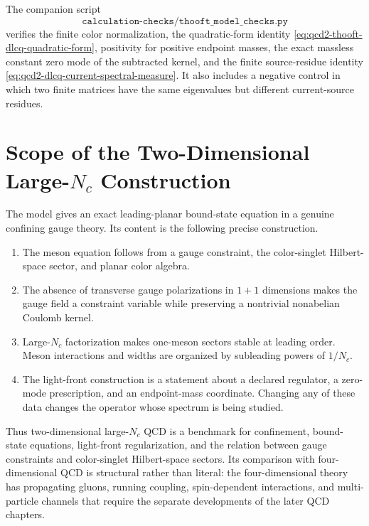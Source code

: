 The companion script
\[
  \texttt{calculation-checks/thooft\_model\_checks.py}
\]
verifies the finite color normalization, the quadratic-form identity
\eqref{eq:qcd2-thooft-dlcq-quadratic-form}, positivity for positive endpoint
masses, the exact massless constant zero mode of the subtracted kernel, and
the finite source-residue identity
\eqref{eq:qcd2-dlcq-current-spectral-measure}.  It also includes a negative
control in which two finite matrices have the same eigenvalues but different
current-source residues.

\section{\texorpdfstring{Scope of the Two-Dimensional Large-\(N_c\) Construction}{Scope of the Two-Dimensional Large-Nc Construction}}

The model gives an exact leading-planar bound-state equation in a genuine
confining gauge theory.  Its content is the following precise construction.
\begin{enumerate}
  \item The meson equation follows from a gauge constraint, the color-singlet
  Hilbert-space sector, and planar color algebra.
  \item The absence of transverse gauge polarizations in \(1+1\) dimensions
  makes the gauge field a constraint variable while preserving a nontrivial
  nonabelian Coulomb kernel.
  \item Large-\(N_c\) factorization makes one-meson sectors stable at leading
  order.  Meson interactions and widths are organized by subleading powers of
  \(1/N_c\).
  \item The light-front construction is a statement about a declared
  regulator, a zero-mode prescription, and an endpoint-mass coordinate.
  Changing any of these data changes the operator whose spectrum is being
  studied.
\end{enumerate}
Thus two-dimensional large-\(N_c\) QCD is a benchmark for confinement,
bound-state equations, light-front regularization, and the relation between
gauge constraints and color-singlet Hilbert-space sectors.  Its comparison
with four-dimensional QCD is structural rather than literal: the
four-dimensional theory has propagating gluons, running coupling,
spin-dependent interactions, and multi-particle channels that require the
separate developments of the later QCD chapters.
